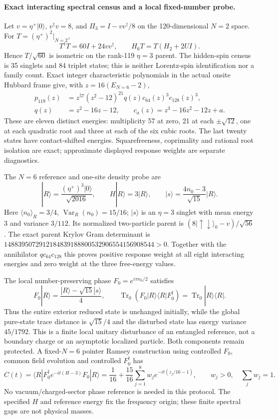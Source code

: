\paragraph{Exact interacting spectral census and a local fixed-number probe.}
Let $v=\eta^+|0\rangle$, $v^\dagger v=8$, and
$\Pi_3=I-vv^\dagger/8$ on the 120-dimensional $N=2$ space.
For $T=(\eta^+)^2|_{N=2}$,
\[
 T^\dagger T=60I+24vv^\dagger,\qquad
 H_6T=T(H_2+2U I).
\]
Hence $T/\sqrt{60}$ is isometric on the rank-119 $\eta=3$ parent.
The hidden-spin census is 35 singlets and 84 triplet states; this is
neither Lorentz-spin identification nor a family count. Exact integer
characteristic polynomials in the actual onsite Hubbard frame give,
with $z=16(E_{N=6}-2)$,
\begin{align*}
 p_{119}(z)&=z^{57}(z^2-12)^{21}q(z)c_{64}(z)^3c_{128}(z)^3,\\
 q(z)&=z^2-16z-12,\qquad
 c_a(z)=z^3-16z^2-12z+a.
\end{align*}
These are eleven distinct energies: multiplicity 57 at zero, 21 at
each $\pm\sqrt{12}$, one at each quadratic root and three at each
of the six cubic roots. The last twenty states have contact-shifted
energies. Squarefreeness, coprimality and rational root isolation are
exact; approximate displayed response weights are separate diagnostics.

The $N=6$ reference and one-site density probe are
\[
 |R\rangle=\frac{(\eta^+)^3|0\rangle}{\sqrt{2016}},\qquad
 H|R\rangle=3|R\rangle,\qquad
 |s\rangle=\frac{4n_0-3}{\sqrt{15}}|R\rangle .
\]
Here $\langle n_0\rangle_R=3/4$, $\operatorname{Var}_R(n_0)=15/16$;
$|s\rangle$ is an $\eta=3$ singlet with mean energy 3 and variance
$3/112$. Its normalized two-particle parent is
$(8|\uparrow\downarrow\rangle_0-v)/\sqrt{56}$.
The exact parent Krylov Gram determinant is
$1488395072912184839188800532906554156908544>0$.
Together with the annihilator $q c_{64}c_{128}$ this proves positive
response weight at all eight interacting energies and zero weight at
the three free-energy values.

The local number-preserving phase $F_0=e^{i\pi n_0/2}$ satisfies
\[
 F_0|R\rangle=\frac{|R\rangle-\sqrt{15}|s\rangle}{4},\qquad
 \operatorname{Tr}_0(F_0|R\rangle\langle R|F_0^\dagger)
 =\operatorname{Tr}_0|R\rangle\langle R| .
\]
Thus the entire exterior reduced state is unchanged initially, while
the global pure-state trace distance is $\sqrt{15}/4$ and the disturbed
state has energy variance $45/1792$. This is a finite local unitary
disturbance of an entangled reference, not a boundary charge or
an asymptotic localized particle. Both components remain protected.
A fixed-$N=6$ pointer Ramsey construction using controlled $F_0$,
common field evolution and controlled $F_0^\dagger$ has
\[
 C(t)=\langle R|F_0^\dagger e^{-it(H-3)}F_0|R\rangle
 =\frac1{16}+\frac{15}{16}\sum_{j=1}^{8}
 w_j e^{-it(z_j/16-1)},\qquad w_j>0,\quad\sum_jw_j=1.
\]
No vacuum/charged-sector phase reference is needed in this protocol.
The specified $H$ and reference energy fix the frequency origin;
these finite spectral gaps are not physical masses.

